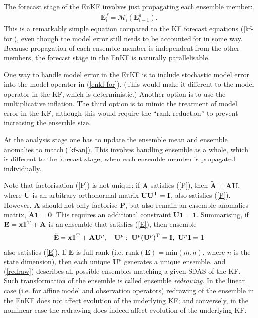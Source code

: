 \documentclass[11pt]{report}
\newcommand{\mb} {\mathbf}
\newcommand{\T}{^{\tiny \mathrm T}}
\begin{document}
The forecast stage of the EnKF involves just propagating each ensemble member:
\begin{align}
  \label{enkf-for}
  \mb E_i^f = \mathcal M_i(\mb E_{i-1}^a).
\end{align}
This is a remarkably simple equation compared to the KF forecast equations (\ref{kf-for}), even though the model error still needs to be accounted for in some way.
Because propagation of each ensemble member is independent from the other members, the forecast stage in the EnKF is naturally parallelisable.

One way to handle model error in the EnKF is to include stochastic model error into the model operator in (\ref{enkf-for}).
(This would make it different to the model operator in the KF, which is deterministic.)
Another option is to use the multiplicative inflation.
The third option is to mimic the treatment of model error in the KF, although this would require the ``rank reduction'' \citep[eq. 28]{ver97a} to prevent increasing the ensemble size.

At the analysis stage one has to update the ensemble mean and ensemble anomalies to match (\ref{kf-an}).
This involves handling ensemble as a whole, which is different to the forecast stage, when each ensemble member is propagated individually.

Note that factorisation (\ref{P}) is not unique: if $\mb A$ satisfies (\ref{P}), then $\tilde {\mb A} = \mb A \mb U$, where $\mb U$ is an arbitrary orthonormal matrix $\mb U \mb U\T = \mb I$, also satisfies (\ref{P}).
However, $\tilde{\mb A}$ should not only factorise $\mb P$, but also remain an ensemble anomalies matrix, $\tilde{\mb A} \mb 1 = \mb 0$.
This requires an additional constraint $\mb U \mb 1 = \mb 1$.
Summarising, if $\mb E = \mb x \mb 1\T + \mb A$ is an ensemble that satisfies (\ref{E}), then ensemble
\begin{align}
  \label{redraw}
  \tilde{\mb E} = \mb x \mb 1\T + \mb A \mb U^p, \quad \mb U^p:\ \mb U^p (\mb U^p)\T = \mb I,\ \mb U^p \mb 1 = \mb 1
\end{align}
also satisfies (\ref{E}). 
If $\mb E$ is full rank (i.e. $\mathrm{rank}(\mb E) = \mathrm{min}(m, n)$, where $n$ is the state dimension), then each unique $\mb U^p$ generates a unique ensemble, and (\ref{redraw}) describes all possible ensembles matching a given SDAS of the KF.
Such transformation of the ensemble is called ensemble \emph{redrawing}.
In the linear case (i.e. for affine model and observation operators) redrawing of the ensemble in the EnKF does not affect evolution of the underlying KF; and conversely, in the nonlinear case the redrawing does indeed affect evolution of the underlying KF.
\end{document}
